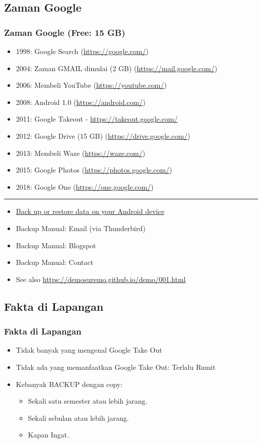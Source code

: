 \documentclass[xcolor=table, notheorems, hyperref={pdfpagelabels=false}]{beamer}
\begin{document}
\begin{frame}[fragile]
\section{Zaman Google}
\frametitle{Zaman Google (Free: 15 GB)}
\begin{itemize}
\item 1998: Google Search {\tiny (\url{https://google.com/})}
\item 2004: Zaman GMAIL dimulai (2 GB) {\tiny (\url{https://mail.google.com/})}
\item 2006: Membeli YouTube {\tiny (\url{https://youtube.com/})}
\item 2008: Android 1.0 {\tiny (\url{https://android.com/})}
\item 2011: Google Takeout - \url{https://takeout.google.com/}
\item 2012: Google Drive (15 GB) {\tiny (\url{https://drive.google.com/})}
\item 2013: Membeli Waze {\tiny (\url{https://waze.com/})}
\item 2015: Google Photos {\tiny (\url{https://photos.google.com/})}
\item 2018: Google One {\tiny (\url{https://one.google.com/})}
\end{itemize}

\noindent\rule{\textwidth}{1pt}

\begin{itemize}
\item \href{https://support.google.com/android/answer/2819582}{Back up or restore data on your Android device}
\item Backup Manual: Email (via Thunderbird)
\item Backup Manual: Blogspot
\item Backup Manual: Contact
\item See also \url{https://demosuremo.github.io/demo/001.html}
\end{itemize}
\end{frame}

\begin{frame}[fragile]
\section{Fakta di Lapangan}
\frametitle{Fakta di Lapangan}
\begin{itemize}
\item Tidak banyak yang mengenal Google Take Out
\item Tidak ada yang memanfaatkan Google Take Out: Terlalu Rumit
\item Kebanyak BACKUP dengan copy:
\begin{itemize}
\item Sekali satu semester atau lebih jarang.
\item Sekali sebulan atau lebih jarang.
\item Kapan Ingat.
\end{itemize}
\end{itemize}
\end{frame}
\end{document}
